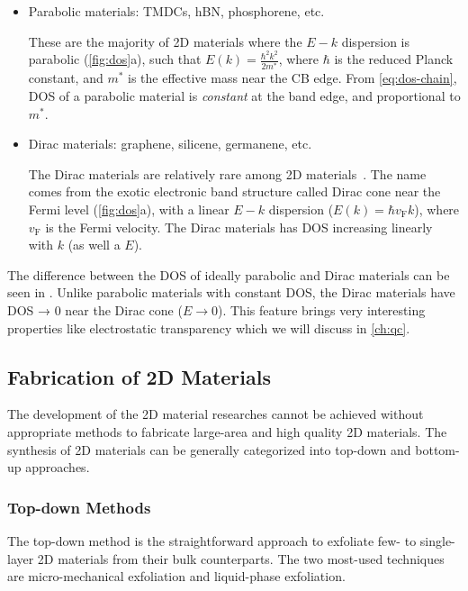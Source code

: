 \begin{itemize}
\item Parabolic materials: TMDCs, hBN, phosphorene, etc.

  These are the majority of 2D materials where the $E-k$ dispersion is
  parabolic (\autoref{fig:dos}a), such that
  ${\displaystyle E(k) = \frac{\hbar^{2} k^{2}}{2 m^{*}}}$, where
  $\hbar$ is the reduced Planck constant, and $m^{*}$ is the effective
  mass near the CB edge. From \autoref{eq:dos-chain}, DOS of a
  parabolic material is \textit{constant} at the band edge, and
  proportional to $m^{*}$.
  
\item Dirac materials: graphene, silicene, germanene, etc.

  The Dirac materials are relatively rare among 2D
  materials~\cite{Wang_2015_rare_dirac}.
  The name comes from the exotic electronic band structure called
  Dirac cone near the Fermi level (\autoref{fig:dos}a), with a linear
  $E-k$ dispersion ($E(k) = \hbar v_{\mathrm{F}}k$), where
  $v_{\mathrm{F}}$ is the Fermi velocity. The Dirac materials has DOS
  increasing linearly with $k$ (as well a $E$).
\end{itemize}

The difference between the DOS of ideally parabolic and Dirac
materials can be seen in . Unlike parabolic
materials with constant DOS, the Dirac materials have DOS → 0 near the
Dirac cone ($E \to 0$). This feature brings very interesting
properties like electrostatic transparency which we will discuss in
\autoref{ch:qc}.


\subsection{Fabrication of 2D Materials}
\label{sec:fabr-2d-mater}

The development of the 2D material researches cannot be achieved
without appropriate methods to fabricate large-area and high quality
2D materials. The synthesis of 2D materials can be generally
categorized into top-down and bottom-up approaches.

\subsubsection{Top-down Methods}
\label{sec:top-down-methods}

The top-down method is the straightforward approach to exfoliate few-
to single-layer 2D materials from their bulk counterparts. The two
most-used techniques are micro-mechanical exfoliation and liquid-phase
exfoliation. 


